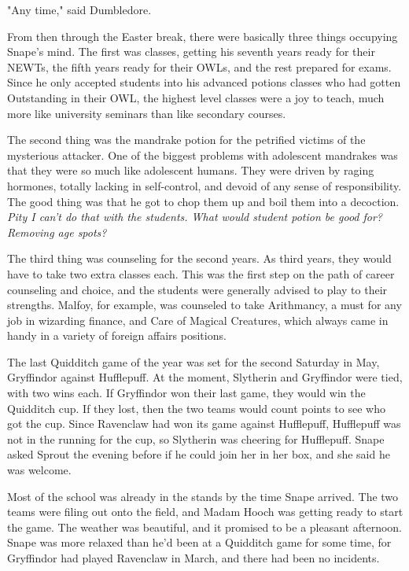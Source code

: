 "Any time," said Dumbledore.

From then through the Easter break, there were basically three things occupying Snape's mind. The first was classes, getting his seventh years ready for their NEWTs, the fifth years ready for their OWLs, and the rest prepared for exams. Since he only accepted students into his advanced potions classes who had gotten Outstanding in their OWL, the highest level classes were a joy to teach, much more like university seminars than like secondary courses.

The second thing was the mandrake potion for the petrified victims of the mysterious attacker. One of the biggest problems with adolescent mandrakes was that they were so much like adolescent humans. They were driven by raging hormones, totally lacking in self-control, and devoid of any sense of responsibility. The good thing was that he got to chop them up and boil them into a decoction. \emph{Pity I can't do that with the students. What would student potion be good for? Removing age spots?}

The third thing was counseling for the second years. As third years, they would have to take two extra classes each. This was the first step on the path of career counseling and choice, and the students were generally advised to play to their strengths. Malfoy, for example, was counseled to take Arithmancy, a must for any job in wizarding finance, and Care of Magical Creatures, which always came in handy in a variety of foreign affairs positions.

\sbreak

The last Quidditch game of the year was set for the second Saturday in May, Gryffindor against Hufflepuff. At the moment, Slytherin and Gryffindor were tied, with two wins each. If Gryffindor won their last game, they would win the Quidditch cup. If they lost, then the two teams would count points to see who got the cup. Since Ravenclaw had won its game against Hufflepuff, Hufflepuff was not in the running for the cup, so Slytherin was cheering for Hufflepuff. Snape asked Sprout the evening before if he could join her in her box, and she said he was welcome.

Most of the school was already in the stands by the time Snape arrived. The two teams were filing out onto the field, and Madam Hooch was getting ready to start the game. The weather was beautiful, and it promised to be a pleasant afternoon. Snape was more relaxed than he'd been at a Quidditch game for some time, for Gryffindor had played Ravenclaw in March, and there had been no incidents.


